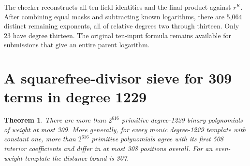 \documentclass[11pt]{article}
\newtheorem{theorem}{Theorem}
\begin{document}
The checker reconstructs all ten field identities and the final
product against \(r^K\). After combining equal masks and subtracting
known logarithms, there are 5,064 distinct remaining exponents, all
of relative degrees two through thirteen. Only 23 have degree
thirteen. The original ten-input formula remains available for
submissions that give an entire parent logarithm.

\section{A squarefree-divisor sieve for 309 terms in degree 1229}
\label{sec:selberg-weight}
\begin{theorem}
There are more than \(2^{616}\) primitive degree-1229 binary
polynomials of weight at most 309. More generally, for every monic
degree-1229 template with constant one, more than \(2^{616}\)
primitive polynomials agree with its first 508 interior coefficients
and differ in at most 308 positions overall. For an even-weight
template the distance bound is 307.
\end{theorem}
\end{document}
